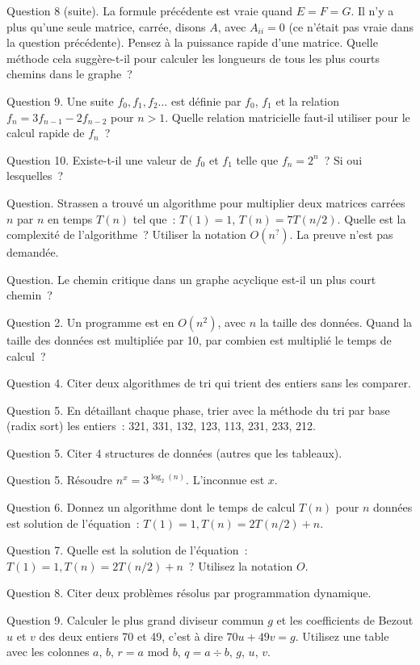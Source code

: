 \documentclass[a4paper]{article}
\begin{document}
Question 8 (suite). La formule précédente est vraie quand $E=F=G$. Il n'y a plus qu'une seule matrice, carrée, disons $A$, avec $A_{ii}=0$ (ce n'était pas vraie dans la question précédente).
Pensez à la puissance rapide d'une matrice. 
Quelle méthode cela suggère-t-il 
pour calculer les longueurs de tous les plus courts chemins dans le graphe~?

Question 9. Une suite $f_0, f_1, f_2\ldots$ est définie par $f_0$, $f_1$ et la relation $f_n=3 f_{n-1} - 2 f_{n-2}$ pour $n>1$. Quelle relation matricielle faut-il utiliser pour le calcul rapide de $f_n$~? 

Question 10. Existe-t-il une valeur de $f_0$ et $f_1$ telle que 
$f_n=2^n$~? Si oui lesquelles~?

Question. Strassen a trouvé un algorithme pour multiplier deux matrices carrées
$n$ par $n$ en temps $T(n)$ tel que~: $T(1)=1$, $T(n)=7 T(n/2)$. Quelle
est la complexité de l'algorithme~? Utiliser la notation $O(n^?)$. La preuve n'est pas demandée.

Question. Le chemin critique dans un graphe acyclique est-il un plus court chemin~?

Question 2. Un programme est en $O(n^2)$, avec $n$ la taille des données. Quand la taille des données est multipliée par 10, par combien est multiplié le temps de calcul~?


Question 4. Citer deux algorithmes de tri qui trient des entiers sans les comparer.

Question 5. En détaillant chaque phase, trier avec la méthode du tri par base (radix sort) les entiers~: 321, 331, 132, 123, 113, 231, 233, 212.

Question 5. Citer 4 structures de données (autres que les tableaux).

Question 5. Résoudre $n^x=3^{\log_2(n)}$. L'inconnue est $x$.

Question 6. Donnez un algorithme dont le temps de calcul $T(n)$ pour $n$ données
est solution de l'équation~: $T(1)=1, T(n)=2T(n/2)+n$.

Question 7. Quelle est la solution de l'équation~: $T(1)=1, T(n)=2T(n/2)+n$~? Utilisez la notation $O$.

Question 8. Citer deux problèmes résolus par programmation dynamique.

Question 9. Calculer le plus grand diviseur commun $g$ et les coefficients de Bezout $u$ et $v$ des deux entiers 70 et 49, c'est à dire
$70 u + 49v = g$. Utilisez une table avec les colonnes $a$, $b$, $r= a \mbox{ mod } b$, $q=a \div b$, $g$, $u$, $v$.
\end{document}
